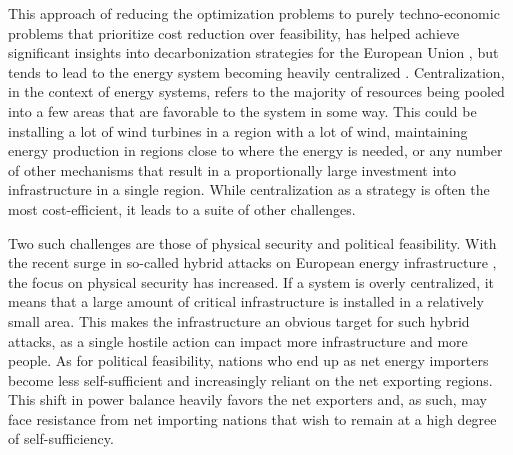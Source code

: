 \documentclass[preprint,12pt,nopreprintline]{elsarticle}
\begin{document}
\medskip
\noindent This approach of reducing the optimization problems to purely techno-economic problems that prioritize cost reduction over feasibility, has helped achieve significant insights into decarbonization strategies for the European Union \cite{henkeComparingEnergySystem2024}, but tends to lead to the energy system becoming heavily centralized \cite{eriksenOptimalHeterogeneitySimplified2017a}. Centralization, in the context of energy systems, refers to the majority of resources being pooled into a few areas that are favorable to the system in some way. This could be installing a lot of wind turbines in a region with a lot of wind, maintaining energy production in regions close to where the energy is needed, or any number of other mechanisms that result in a proportionally large investment into infrastructure in a single region. While centralization as a strategy is often the most cost-efficient, it leads to a suite of other challenges.

\medskip
\noindent Two such challenges are those of physical security and political feasibility. With the recent surge in so-called hybrid attacks on European energy infrastructure \cite{ScaleRussianSabotage}, the focus on physical security has increased. If a system is overly centralized, it means that a large amount of critical infrastructure is installed in a relatively small area. This makes the infrastructure an obvious target for such hybrid attacks, as a single hostile action can impact more infrastructure and more people. As for political feasibility, nations who end up as net energy importers become less self-sufficient and increasingly reliant on the net exporting regions. This shift in power balance heavily favors the net exporters and, as such, may face resistance from net importing nations that wish to remain at a high degree of self-sufficiency.
\end{document}
